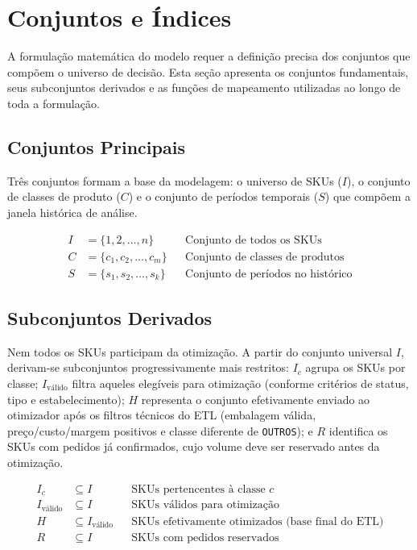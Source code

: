 \documentclass[11pt,a4paper]{article}
\begin{document}
\section{Conjuntos e Índices}

A formulação matemática do modelo requer a definição precisa dos conjuntos que
compõem o universo de decisão. Esta seção apresenta os conjuntos fundamentais,
seus subconjuntos derivados e as funções de mapeamento utilizadas ao longo de
toda a formulação.

\subsection{Conjuntos Principais}

Três conjuntos formam a base da modelagem: o universo de SKUs ($I$), o conjunto
de classes de produto ($C$) e o conjunto de períodos temporais ($S$) que
compõem a janela histórica de análise.

\begin{align}\label{eq:auto:al:001}
I &= \{1, 2, \ldots, n\} && \text{Conjunto de todos os SKUs} \\
C &= \{c_1, c_2, \ldots, c_m\} && \text{Conjunto de classes de produtos} \\
S &= \{s_1, s_2, \ldots, s_k\} && \text{Conjunto de períodos no histórico}
\end{align}

\subsection{Subconjuntos Derivados}

Nem todos os SKUs participam da otimização. A partir do conjunto universal $I$,
derivam-se subconjuntos progressivamente mais restritos: $I_c$ agrupa os SKUs
por classe; $I_{\text{válido}}$ filtra aqueles elegíveis para otimização
(conforme critérios de status, tipo e estabelecimento); $H$ representa o
conjunto efetivamente enviado ao otimizador após os filtros técnicos do ETL
(embalagem válida, preço/custo/margem positivos e classe diferente de
\texttt{OUTROS}); e $R$ identifica os SKUs com pedidos já confirmados, cujo
volume deve ser reservado antes da otimização.

\begin{align}\label{eq:auto:al:002}
I_c &\subseteq I && \text{SKUs pertencentes à classe } c \\
I_{\text{válido}} &\subseteq I && \text{SKUs válidos para otimização} \\
H &\subseteq I_{\text{válido}} && \text{SKUs efetivamente otimizados (base final do ETL)} \\
R &\subseteq I && \text{SKUs com pedidos reservados}
\end{align}
\end{document}
